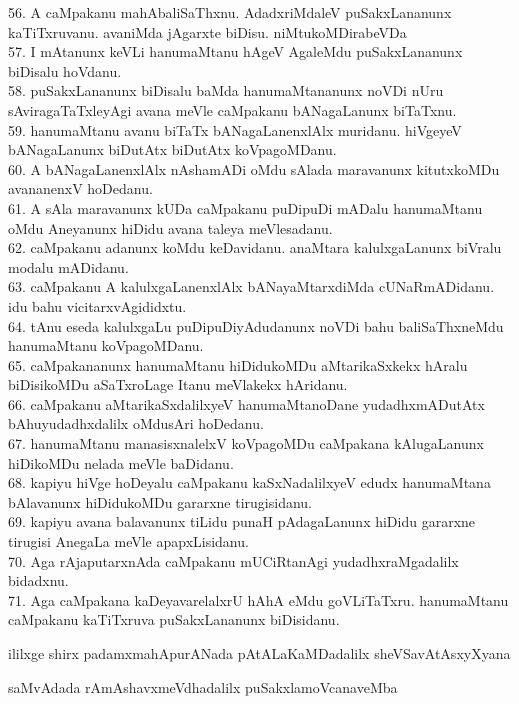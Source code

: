 \documentclass{article}
\begin{document}
56. A caMpakanu mahAbaliSaThxnu. AdadxriMdaleV puSakxLananunx kaTiTxruvanu. avaniMda jAgarxte biDisu. niMtukoMDirabeVDa\\
57. I mAtanunx keVLi hanumaMtanu hAgeV AgaleMdu puSakxLananunx biDisalu hoVdanu.\\
58. puSakxLananunx biDisalu baMda hanumaMtananunx noVDi nUru sAviragaTaTxleyAgi avana meVle caMpakanu bANagaLanunx biTaTxnu.\\
59. hanumaMtanu avanu biTaTx bANagaLanenxlAlx muridanu. hiVgeyeV bANagaLanunx biDutAtx biDutAtx koVpagoMDanu.\\
60. A bANagaLanenxlAlx nAshamADi oMdu sAlada maravanunx kitutxkoMDu avananenxV hoDedanu.\\
61. A sAla maravanunx kUDa caMpakanu puDipuDi mADalu hanumaMtanu oMdu Aneyanunx hiDidu avana taleya meVlesadanu.\\
62. caMpakanu adanunx koMdu keDavidanu. anaMtara kalulxgaLanunx biVralu modalu mADidanu.\\
63. caMpakanu A kalulxgaLanenxlAlx bANayaMtarxdiMda cUNaRmADidanu. idu bahu vicitarxvAgididxtu.\\
64. tAnu eseda kalulxgaLu puDipuDiyAdudanunx noVDi bahu baliSaThxneMdu hanumaMtanu koVpagoMDanu.\\
65. caMpakananunx hanumaMtanu hiDidukoMDu aMtarikaSxkekx hAralu biDisikoMDu aSaTxroLage Itanu meVlakekx hAridanu.\\
66. caMpakanu aMtarikaSxdalilxyeV hanumaMtanoDane yudadhxmADutAtx bAhuyudadhxdalilx oMdusAri hoDedanu.\\
67. hanumaMtanu manasisxnalelxV koVpagoMDu caMpakana kAlugaLanunx hiDikoMDu nelada meVle baDidanu.\\
68. kapiyu hiVge hoDeyalu caMpakanu kaSxNadalilxyeV edudx hanumaMtana bAlavanunx hiDidukoMDu gararxne tirugisidanu.\\
69. kapiyu avana balavanunx tiLidu punaH pAdagaLanunx hiDidu gararxne tirugisi AnegaLa meVle apapxLisidanu.\\
70. Aga rAjaputarxnAda caMpakanu mUCiRtanAgi yudadhxraMgadalilx bidadxnu.\\
71. Aga caMpakana kaDeyavarelalxrU hAhA eMdu goVLiTaTxru. hanumaMtanu caMpakanu kaTiTxruva puSakxLananunx biDisidanu.

\begin{center}
ililxge shirx padamxmahApurANada pAtALaKaMDadalilx sheVSavAtAsxyXyana
\end{center}

\begin{center}
saMvAdada rAmAshavxmeVdhadalilx puSakxlamoVcanaveMba
\end{center}
\end{document}
